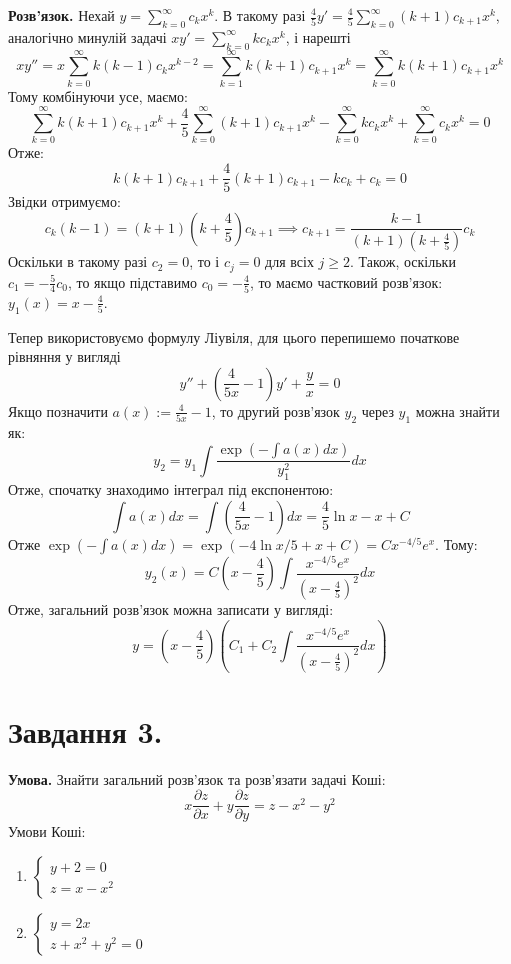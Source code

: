 \documentclass[14pt]{extarticle}
\begin{document}
\textbf{Розв'язок.} Нехай $y=\sum_{k=0}^{\infty}c_kx^k$. В такому разі $\frac{4}{5}y'=\frac{4}{5}\sum_{k=0}^{\infty}(k+1)c_{k+1}x^k$, аналогічно минулій задачі $xy' = \sum_{k=0}^{\infty}kc_kx^k$, і нарешті
\[
xy'' = x\sum_{k=0}^{\infty} k(k-1)c_kx^{k-2} = \sum_{k=1}^{\infty} k(k+1)c_{k+1}x^k = \sum_{k=0}^{\infty} k(k+1)c_{k+1}x^k
\]
Тому комбінуючи усе, маємо:
\[
\sum_{k=0}^{\infty} k(k+1)c_{k+1}x^k + \frac{4}{5}\sum_{k=0}^{\infty}(k+1)c_{k+1}x^k - \sum_{k=0}^{\infty}kc_kx^k + \sum_{k=0}^{\infty}c_kx^k
 = 0\]
 Отже:
 \[
 k(k+1)c_{k+1} + \frac{4}{5}(k+1)c_{k+1} - kc_k + c_k = 0
 \]
 Звідки отримуємо:
 \[
 c_k(k-1) = (k+1)\left(k+\frac{4}{5}\right)c_{k+1} \implies c_{k+1} = \frac{k-1}{(k+1)\left(k+\frac{4}{5}\right)}c_k
 \]
 Оскільки в такому разі $c_2=0$, то і $c_j=0$ для всіх $j\geq2$. Також, оскільки $c_1=-\frac{5}{4}c_0$, то якщо підставимо $c_0=-\frac{4}{5}$, то маємо частковий розв'язок: $y_1(x) = x - \frac{4}{5}$.

Тепер використовуємо формулу Ліувіля, для цього перепишемо початкове рівняння у вигляді
\[
y'' + \left(\frac{4}{5x}-1\right)y' + \frac{y}{x} = 0
\]
Якщо позначити $a(x):=\frac{4}{5x}-1$, то другий розв'язок $y_2$ через $y_1$ можна знайти як:
\[
y_2 = y_1\int \frac{\exp\left(-\int a(x)dx\right)}{y_1^2}dx
\]
Отже, спочатку знаходимо інтеграл під експонентою:
\[
\int a(x)dx = \int \left(\frac{4}{5x} - 1\right)dx = \frac{4}{5}\ln x - x + C
\]
Отже $\exp\left(-\int a(x)dx\right)=\exp(-4\ln x/5 + x + C)=Cx^{-4/5}e^x$. Тому:
\[
y_2(x) = C\left(x-\frac{4}{5}\right) \int \frac{x^{-4/5}e^x}{\left(x-\frac{4}{5}\right)^2}dx
\]
Отже, загальний розв'язок можна записати у вигляді:
\[
y = \left(x - \frac{4}{5}\right)\left(C_1 + C_2\int \frac{x^{-4/5}e^x}{\left(x-\frac{4}{5}\right)^2}dx\right)
\]

\section*{Завдання 3.}

\textbf{Умова.} Знайти загальний розв'язок та розв'язати задачі Коші:
\[
x \frac{\partial z}{\partial x} + y \frac{\partial z}{\partial y} = z - x^2 - y^2
\]
Умови Коші:
\begin{enumerate}
    \item $\begin{cases}
        y+2=0 \\ z = x - x^2
    \end{cases}$
    \item $\begin{cases}
        y = 2x \\ z + x^2 + y^2 = 0
    \end{cases}$
\end{enumerate}
\end{document}
